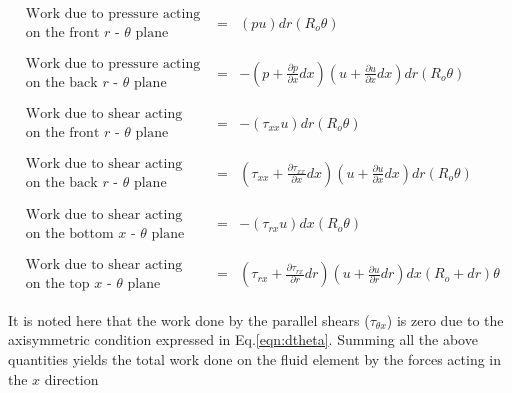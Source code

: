 \begin{displaymath}
	\begin{array}{ccc}
	   \begin{array}{c}
		\textrm{Work due to pressure acting} \\ \textrm{on the front $r$ - $\theta$ plane}
	   \end{array} & = &
	(pu)dr(R_o \theta)
	\\ & & \\
	   \begin{array}{c}
		\textrm{Work due to pressure acting} \\ \textrm{on the back $r$ - $\theta$ plane}
	   \end{array} & = &
	-(p + \frac{\partial p}{\partial x}dx)(u + \frac{\partial u}{\partial x}dx)dr(R_o \theta)
	\\ & & \\
	   \begin{array}{c}
		\textrm{Work due to shear acting} \\ \textrm{on the front $r$ - $\theta$ plane}
	   \end{array} & = &
	-(\tau_{xx}u)dr(R_o \theta)
	\\ & & \\
	   \begin{array}{c}
		\textrm{Work due to shear acting} \\ \textrm{on the back $r$ - $\theta$ plane}
	   \end{array} & = &
	(\tau_{xx} + \frac{\partial \tau_{xx}}{\partial x}dx)(u + \frac{\partial u}{\partial x}dx)dr(R_o \theta)
	\\ & & \\
	   \begin{array}{c}
		\textrm{Work due to shear acting} \\ \textrm{on the bottom $x$ - $\theta$ plane}
	   \end{array} & = &
	-(\tau_{rx}u)dx(R_o \theta)
	\\ & & \\
	   \begin{array}{c}
		\textrm{Work due to shear acting} \\ \textrm{on the top $x$ - $\theta$ plane}
	   \end{array} & = &
	(\tau_{rx} + \frac{\partial \tau_{rx}}{\partial r}dr)(u + \frac{\partial u}{\partial r}dr)dx(R_o + dr) \theta
	\end{array}
\end{displaymath}
	
	It is noted here that the work done by the parallel shears ($\tau_{\theta x}$) is zero due to the axisymmetric
condition expressed in Eq.\ref{eqn:dtheta}.  Summing all the above quantities yields the total work done on the 
fluid element by the forces acting in the $x$ direction

